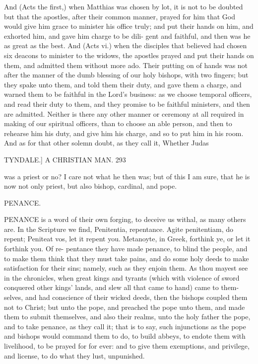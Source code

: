 \documentclass{custom}
\begin{document}
{{And (Acts the first,) when Matthias was chosen by lot, 
it is not to be doubted but that the apostles, after their 
common manner, prayed for him that God would give him 
grace to minister his office truly; and put their hands on 
him, and exhorted him, and gave him charge to be dili- 
gent and faithful, and then was he as great as the best. 
And (Acts vi.) when the disciples that believed had chosen 
six deacons to minister to the widows, the apostles prayed 
and put their hands on them, and admitted them without 
more ado. Their putting on of hands was not after the 
manner of the dumb blessing of our holy bishops, with 
two fingers; but they spake unto them, and told them their 
duty, and gave them a charge, and warned them to be 
faithful in the Lord's business: as we choose temporal 
officers, and read their duty to them, and they promise to 
be faithful ministers, and then are admitted. Neither is 
there any other manner or ceremony at all required in 
making of our spiritual officers, than to choose an able 
person, and then to rehearse him his duty, and give him 
his charge, and so to put him in his room. And as for 
that other solemn doubt, as they call it, Whether Judas 


TYNDALE.] A CHRISTIAN MAN. 293

was a priest or no? I care not what he then was; but of
this I am sure, that he is now not only priest, but also
bishop, cardinal, and pope. 


PENANCE. 

PENANCE is a word of their own forging, to deceive 
us withal, as many others are. In the Scripture 
we find, Penitentia, repentance. Agite penitentiam, do 
repent; Peniteat vos, let it repent you. Metanoyte, in 
Greek, forthink ye, or let it forthink you. Of re-
pentance they have made penance, to blind the people,
and to make them think that they must take pains, 
and do some holy deeds to make satisfaction for their 
sins; namely, such as they enjoin them. As thou mayest 
see in the chronicles, when great kings and tyrants 
(which with violence of sword conquered other kings' 
lands, and slew all that came to hand) came to them- 
selves, and had conscience of their wicked deeds, then the 
bishops coupled them not to Christ; but unto the pope, 
and preached the pope unto them, and made them to 
submit themselves, and also their realms, unto the holy 
father the pope, and to take penance, as they call it; 
that is to say, such injunctions as the pope and bishops 
would command them to do, to build abbeys, to endote 
them with livelihood, to be prayed for for ever: and to 
give them exemptions, and privilege, and license, to do 
what they lust, unpunished. 

}}
\end{document}
